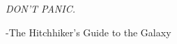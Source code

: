\begin{epigrafe}
    \vspace*{\fill}
	\begin{flushright}
        \epigraph{\huge \textsf{\em DON'T PANIC.}}{-The Hitchhiker's Guide to the Galaxy}
	\end{flushright}
\end{epigrafe}

